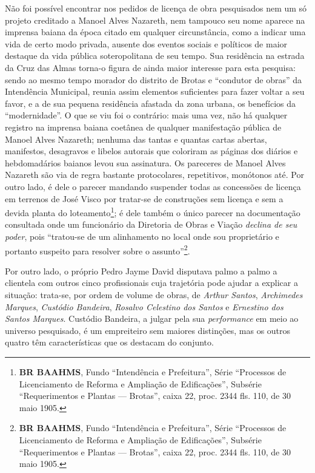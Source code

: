 Não foi possível encontrar nos pedidos de licença de obra pesquisados nem um só projeto creditado a Manoel Alves Nazareth, nem tampouco seu nome aparece na imprensa baiana da época citado em qualquer circunstância, como a indicar uma vida de certo modo privada, ausente dos eventos sociais e políticos de maior destaque da vida pública soteropolitana de seu tempo. Sua residência na estrada da Cruz das Almas torna-o figura de ainda maior interesse para esta pesquisa: sendo ao mesmo tempo morador do distrito de Brotas e ``condutor de obras'' da Intendência Municipal, reunia assim elementos suficientes para fazer voltar a seu favor, e a de sua pequena residência afastada da zona urbana, os benefícios da ``modernidade''. O que se viu foi o contrário: mais uma vez, não há qualquer registro na imprensa baiana coetânea de qualquer manifestação pública de Manoel Alves Nazareth; nenhuma das tantas e quantas cartas abertas, manifestos, desagravos e libelos autorais que coloriram as páginas dos diários e hebdomadários baianos levou sua assinatura. Os pareceres de Manoel Alves Nazareth são via de regra bastante protocolares, repetitivos, monótonos até. Por outro lado, é dele o parecer mandando suspender todas as concessões de licença em terrenos de José Visco por tratar-se de construções sem licença e sem a devida planta do loteamento\footnote{\textbf{BR BAAHMS}, Fundo ``Intendência e Prefeitura'', Série ``Processos de Licenciamento de Reforma e Ampliação de Edificações'', Subsérie ``Requerimentos e Plantas --- Brotas'', caixa 22, proc. 2344 fls. 110, de 30 maio 1905.}; é dele também o único parecer na documentação consultada onde um funcionário da Diretoria de Obras e Viação \textit{declina de seu poder}, pois ``tratou-se de um alinhamento no local onde sou proprietário e portanto suspeito para resolver sobre o assunto''\footnote{\textbf{BR BAAHMS}, Fundo ``Intendência e Prefeitura'', Série ``Processos de Licenciamento de Reforma e Ampliação de Edificações'', Subsérie ``Requerimentos e Plantas --- Brotas'', caixa 22, proc. 2344 fls. 110, de 30 maio 1905.}.

Por outro lado, o próprio Pedro Jayme David disputava palmo a palmo a clientela com outros cinco profissionais cuja trajetória pode ajudar a explicar a situação: trata-se, por ordem de volume de obras, de \textit{Arthur Santos}, \textit{Archimedes Marques}, \textit{Custódio Bandeira}, \textit{Rosalvo Celestino dos Santos} e \textit{Ernestino dos Santos Marques}. Custódio Bandeira, a julgar pela sua \textit{performance} em meio ao universo pesquisado, é um empreiteiro sem maiores distinções, mas os outros quatro têm características que os destacam do conjunto.

